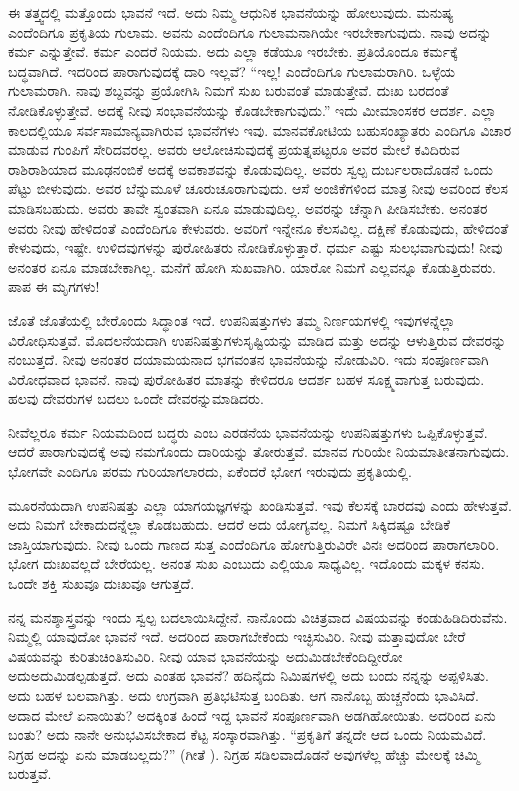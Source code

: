 ಈ ತತ್ತ್ವದಲ್ಲಿ ಮತ್ತೊಂದು ಭಾವನೆ ಇದೆ. ಅದು ನಿಮ್ಮ ಆಧುನಿಕ ಭಾವನೆಯನ್ನು ಹೋಲುವುದು. ಮನುಷ್ಯ ಎಂದೆಂದಿಗೂ ಪ್ರಕೃತಿಯ ಗುಲಾಮ. ಅವನು ಎಂದೆಂದಿಗೂ ಗುಲಾಮನಾಗಿಯೇ ಇರಬೇಕಾಗುವುದು. ನಾವು ಅದನ್ನು ಕರ್ಮ ಎನ್ನುತ್ತೇವೆ. ಕರ್ಮ ಎಂದರೆ ನಿಯಮ. ಅದು ಎಲ್ಲಾ ಕಡೆಯೂ ಇರಬೇಕು. ಪ್ರತಿಯೊಂದೂ ಕರ್ಮಕ್ಕೆ ಬದ್ಧವಾಗಿದೆ. ಇದರಿಂದ ಪಾರಾಗುವುದಕ್ಕೆ ದಾರಿ ಇಲ್ಲವೆ? “ಇಲ್ಲ! ಎಂದೆಂದಿಗೂ ಗುಲಾಮ\-ರಾಗಿರಿ. ಒಳ್ಳೆಯ ಗುಲಾಮರಾಗಿ. ನಾವು ಶಬ್ದವನ್ನು ಪ್ರಯೋಗಿಸಿ ನಿಮಗೆ ಸುಖ ಬರುವಂತೆ ಮಾಡುತ್ತೇವೆ. ದುಃಖ ಬರದಂತೆ ನೋಡಿಕೊಳ್ಳುತ್ತೇವೆ. ಅದಕ್ಕೆ ನೀವು ಸಂಭಾವನೆಯನ್ನು ಕೊಡಬೇಕಾಗುವುದು.” ಇದು ಮೀಮಾಂಸಕರ ಆದರ್ಶ. ಎಲ್ಲಾ ಕಾಲದಲ್ಲಿಯೂ ಸರ್ವ\-ಸಾಮಾನ್ಯವಾಗಿರುವ ಭಾವನೆಗಳು ಇವು. ಮಾನವಕೋಟಿಯ ಬಹುಸಂಖ್ಯಾತರು ಎಂದಿಗೂ ವಿಚಾರ ಮಾಡುವ ಗುಂಪಿಗೆ ಸೇರಿದವರಲ್ಲ. ಅವರು ಆಲೋಚಿಸುವುದಕ್ಕೆ ಪ್ರಯತ್ನಪಟ್ಟರೂ ಅವರ ಮೇಲೆ ಕವಿದಿರುವ ರಾಶಿರಾಶಿಯಾದ ಮೂಢನಂಬಿಕೆ ಅದಕ್ಕೆ ಅವಕಾಶವನ್ನು ಕೊಡುವುದಿಲ್ಲ. ಅವರು ಸ್ವಲ್ಪ ದುರ್ಬಲರಾದೊಡನೆ ಒಂದು ಪೆಟ್ಟು ಬೀಳುವುದು. ಅವರ ಬೆನ್ನುಮೂಳೆ ಚೂರುಚೂರಾಗುವುದು. ಆಸೆ ಅಂಜಿಕೆಗಳಿಂದ ಮಾತ್ರ ನೀವು ಅವರಿಂದ ಕೆಲಸ ಮಾಡಿಸಬಹುದು. ಅವರು ತಾವೇ ಸ್ವಂತವಾಗಿ ಏನೂ ಮಾಡುವುದಿಲ್ಲ. ಅವರನ್ನು ಚೆನ್ನಾಗಿ ಪೀಡಿಸಬೇಕು. ಅನಂತರ ಅವರು ನೀವು ಹೇಳಿದಂತೆ ಎಂದೆಂದಿಗೂ ಕೇಳುವರು. ಅವರಿಗೆ ಇನ್ನೇನೂ ಕೆಲಸವಿಲ್ಲ. ದಕ್ಷಿಣೆ ಕೊಡುವುದು, ಹೇಳಿದಂತೆ ಕೇಳುವುದು, ಇಷ್ಟೇ. ಉಳಿದವುಗಳನ್ನು ಪುರೋಹಿತರು ನೋಡಿಕೊಳ್ಳುತ್ತಾರೆ. ಧರ್ಮ ಎಷ್ಟು ಸುಲಭವಾಗುವುದು! ನೀವು ಅನಂತರ ಏನೂ ಮಾಡಬೇಕಾಗಿಲ್ಲ. ಮನೆಗೆ ಹೋಗಿ ಸುಖವಾಗಿರಿ. ಯಾರೋ ನಿಮಗೆ ಎಲ್ಲವನ್ನೂ ಕೊಡುತ್ತಿರುವರು. ಪಾಪ ಈ ಮೃಗಗಳು!

ಜೊತೆ ಜೊತೆಯಲ್ಲಿ ಬೇರೊಂದು ಸಿದ್ಧಾಂತ ಇದೆ. ಉಪನಿಷತ್ತುಗಳು ತಮ್ಮ ನಿರ್ಣಯಗಳಲ್ಲಿ ಇವುಗಳನ್ನೆಲ್ಲಾ ವಿರೋಧಿಸುತ್ತವೆ. ಮೊದಲನೆಯದಾಗಿ ಉಪನಿಷತ್ತುಗಳು\break ಸೃಷ್ಟಿಯನ್ನು ಮಾಡಿದ ಮತ್ತು ಅದನ್ನು ಆಳುತ್ತಿರುವ ದೇವರನ್ನು ನಂಬುತ್ತದೆ. ನೀವು ಅನಂತರ ದಯಾಮಯನಾದ ಭಗವಂತನ ಭಾವನೆಯನ್ನು ನೋಡುವಿರಿ. ಇದು ಸಂಪೂರ್ಣವಾಗಿ ವಿರೋಧವಾದ ಭಾವನೆ. ನಾವು ಪುರೋಹಿತರ ಮಾತನ್ನು ಕೇಳಿದರೂ ಆದರ್ಶ ಬಹಳ ಸೂಕ್ಷ್ಮವಾಗುತ್ತ ಬರುವುದು. ಹಲವು ದೇವರುಗಳ ಬದಲು ಒಂದೇ ದೇವರನ್ನು\break ಮಾಡಿದರು.

ನೀವೆಲ್ಲರೂ ಕರ್ಮ ನಿಯಮದಿಂದ ಬದ್ಧರು ಎಂಬ ಎರಡನೆಯ ಭಾವನೆಯನ್ನು ಉಪನಿಷತ್ತುಗಳು ಒಪ್ಪಿಕೊಳ್ಳುತ್ತವೆ. ಆದರೆ ಪಾರಾಗುವುದಕ್ಕೆ ಅವು ನಮಗೊಂದು ದಾರಿಯನ್ನು ತೋರುತ್ತವೆ. ಮಾನವ ಗುರಿಯೇ ನಿಯಮಾತೀತನಾಗುವುದು. ಭೋಗವೇ ಎಂದಿಗೂ ಪರಮ ಗುರಿಯಾಗಲಾರದು, ಏಕೆಂದರೆ ಭೋಗ ಇರುವುದು ಪ್ರಕೃತಿಯಲ್ಲಿ.

ಮೂರನೆಯದಾಗಿ ಉಪನಿಷತ್ತು ಎಲ್ಲಾ ಯಾಗಯಜ್ಞಗಳನ್ನು ಖಂಡಿಸುತ್ತವೆ. ಇವು ಕೆಲಸಕ್ಕೆ ಬಾರದವು ಎಂದು ಹೇಳುತ್ತವೆ. ಅದು ನಿಮಗೆ ಬೇಕಾದುದನ್ನೆಲ್ಲಾ ಕೊಡಬಹುದು. ಆದರೆ ಅದು ಯೋಗ್ಯವಲ್ಲ. ನಿಮಗೆ ಸಿಕ್ಕಿದಷ್ಟೂ ಬೇಡಿಕೆ ಜಾಸ್ತಿಯಾಗುವುದು. ನೀವು ಒಂದು ಗಾಣದ ಸುತ್ತ ಎಂದೆಂದಿಗೂ ಹೋಗುತ್ತಿರುವಿರೇ ವಿನಃ ಅದರಿಂದ ಪಾರಾಗಲಾರಿರಿ. ಭೋಗ ದುಃಖವಲ್ಲದೆ ಬೇರೆಯಲ್ಲ. ಅನಂತ ಸುಖ ಎಂಬುದು ಎಲ್ಲಿಯೂ ಸಾಧ್ಯವಿಲ್ಲ. ಇದೊಂದು ಮಕ್ಕಳ ಕನಸು. ಒಂದೇ ಶಕ್ತಿ ಸುಖವೂ ದುಃಖವೂ ಆಗುತ್ತದೆ.

ನನ್ನ ಮನಶ್ಶಾಸ್ತ್ರವನ್ನು ಇಂದು ಸ್ವಲ್ಪ ಬದಲಾಯಿಸಿದ್ದೇನೆ. ನಾನೊಂದು ವಿಚಿತ್ರವಾದ ವಿಷಯವನ್ನು ಕಂಡುಹಿಡಿದಿರುವೆನು. ನಿಮ್ಮಲ್ಲಿ ಯಾವುದೋ ಭಾವನೆ ಇದೆ. ಅದರಿಂದ ಪಾರಾಗಬೇಕೆಂದು ಇಚ್ಛಿಸುವಿರಿ. ನೀವು ಮತ್ತಾವುದೋ ಬೇರೆ ವಿಷಯವನ್ನು ಕುರಿತು\break ಚಿಂತಿಸುವಿರಿ. ನೀವು ಯಾವ ಭಾವನೆಯನ್ನು ಅದುಮಿಡಬೇಕೆಂದಿದ್ದೀರೋ ಅದು\break ಅದುಮಿಡಲ್ಪಡುತ್ತದೆ. ಅದು ಎಂತಹ ಭಾವನೆ? ಹದಿನೈದು ನಿಮಿಷಗಳಲ್ಲಿ ಅದು ಬಂದು ನನ್ನನ್ನು ಅಪ್ಪಳಿಸಿತು. ಅದು ಬಹಳ ಬಲವಾಗಿತ್ತು. ಅದು ಉಗ್ರವಾಗಿ ಪ್ರತಿಭಟಿಸುತ್ತ ಬಂದಿತು. ಆಗ ನಾನೊಬ್ಬ ಹುಚ್ಚನೆಂದು ಭಾವಿಸಿದೆ. ಅದಾದ ಮೇಲೆ ಏನಾಯಿತು? ಅದಕ್ಕಿಂತ ಹಿಂದೆ ಇದ್ದ ಭಾವನೆ ಸಂಪೂರ್ಣವಾಗಿ ಅಡಗಿಹೋಯಿತು. ಅದರಿಂದ ಏನು ಬಂತು? ಅದು ನಾನೇ ಅನುಭವಿಸಬೇಕಾದ ಕೆಟ್ಟ ಸಂಸ್ಕಾರವಾಗಿತ್ತು. “ಪ್ರಕೃತಿಗೆ ತನ್ನದೇ ಆದ ಒಂದು ನಿಯಮವಿದೆ. ನಿಗ್ರಹ ಅದನ್ನು ಏನು ಮಾಡಬಲ್ಲದು?” (ಗೀತೆ ). ನಿಗ್ರಹ ಸಡಿಲವಾದೊಡನೆ ಅವುಗಳೆಲ್ಲ ಹೆಚ್ಚು ಮೇಲಕ್ಕೆ ಚಿಮ್ಮಿ ಬರುತ್ತವೆ.

